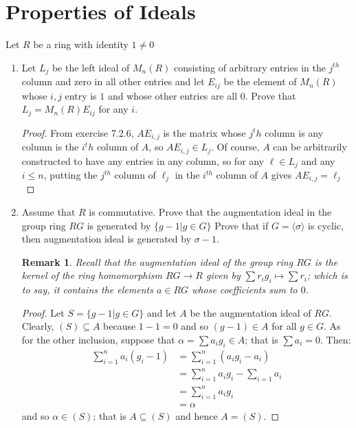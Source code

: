 \documentclass{report}
\newcommand{\rarrow}{\rightarrow}
\newtheorem*{remark}{Remark}
\begin{document}
\section{Properties of Ideals}
Let $R$ be a ring with identity $1\neq 0$
\begin{enumerate}
    \item Let $L_j$ be the left ideal of $M_n(R)$ consisting of arbitrary entries in the $j^{th}$ column and zero in all other entries and let $E_{ij}$ be the element of $M_n(R)$ whose $i,j$ entry is $1$ and whose other entries are all $0$. Prove that $L_j=M_n(R)E_{ij}$ for any $i$.
    \begin{proof}
        From exercise 7.2.6, $AE_{i,j}$ is the matrix whose $j^th$ column is any column is the $i^th$ column of $A$, so $AE_{i,j}\in L_j$. Of course, $A$ can be arbitrarily constructed to have any entries in any column, so for any $\ell\in L_j$ and any $i\leq n$, putting the $j^{th}$ column of $\ell_j$ in the $i^{th}$ column of $A$ gives $AE_{i,j}=\ell_j$
    \end{proof}


    \item Assume that $R$ is commutative. Prove that the augmentation ideal in the group ring $RG$ is generated by $\{g-1|g\in G\}$ Prove that if $G=\langle \sigma \rangle$ is cyclic, then augmentation ideal is generated by $\sigma - 1$.

    \begin{remark}
        Recall that the augmentation ideal of the group ring $RG$ is the kernel of the ring homomorphism $RG\rarrow R$ given by $\sum r_ig_i\mapsto\sum r_i$; which is to say, it contains the elements $a\in RG$ whose coefficients sum to $0$.
    \end{remark}
    \begin{proof}
        Let $S=\{g-1|g\in G\}$ and let $A$ be the augmentation ideal of $RG$. Clearly, $(S)\subseteq A$ because $1-1=0$ and so $(g-1)\in A$ for all $g\in G$. As for the other inclusion, suppose that $\alpha = \sum a_ig_i\in A$; that is $\sum a_i = 0$. Then:
        \begin{align*}
            \sum_{i=1}^na_i(g_i - 1) &= \sum_{i=1}^n(a_ig_i - a_i)\\
            &= \sum_{i=1}^na_ig_i - \sum_{i=1}a_i\\
            &= \sum_{i=1}^na_ig_i\\
            &= \alpha
        \end{align*}
        and so $\alpha\in (S)$; that is $A\subseteq (S)$ and hence $A=(S)$.
        \bigskip


\end{proof}
\end{enumerate}
\end{document}
